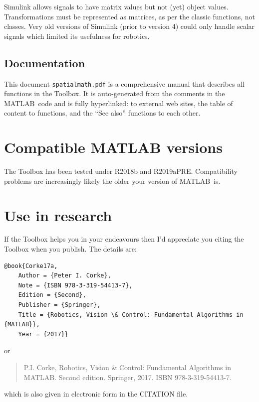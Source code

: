 \documentclass[a4paper,twoside]{report}
\def\Mlab{MATLAB}
\begin{document}
Simulink allows signals to have matrix values but not (yet) object values.  Transformations must be represented as matrices, as per the classic functions, not classes.
Very old versions of Simulink (prior to version 4) could only handle scalar signals which limited its usefulness for robotics.

\subsection{Documentation}
This document {\tt spatialmath.pdf} is a comprehensive manual that describes all functions in the Toolbox.
It is auto-generated from the comments in the \Mlab\ code and is fully hyperlinked:
to external web sites, the table of content to functions, and the ``See also'' functions
to each other.



\section{Compatible MATLAB versions}
The Toolbox has been tested under R2018b and R2019aPRE.  Compatibility problems are increasingly likely the older your version of \Mlab\ is.

\section{Use in research}
If the Toolbox helps you in your endeavours then I'd appreciate you citing the Toolbox when you publish.
The details are:
\begin{verbatim}
@book{Corke17a,
    Author = {Peter I. Corke},
    Note = {ISBN 978-3-319-54413-7},
    Edition = {Second},
    Publisher = {Springer},
    Title = {Robotics, Vision \& Control: Fundamental Algorithms in {MATLAB}},
    Year = {2017}}
\end{verbatim}
or
\begin{quote}
P.I. Corke, Robotics, Vision \& Control: Fundamental Algorithms in MATLAB. Second edition. Springer, 2017. ISBN 978-3-319-54413-7.
\end{quote}
which is also given in electronic form in the CITATION file.
\end{document}
